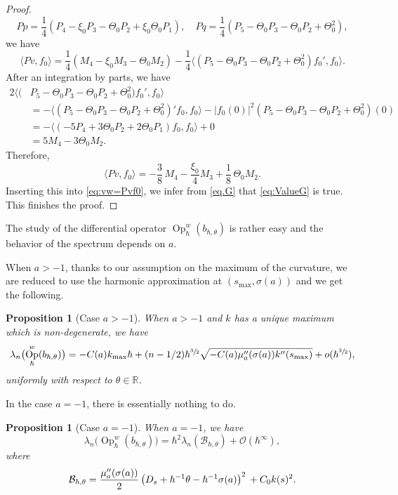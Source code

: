 \documentclass[JEP,XML,SOM,Unicode,NoFloatCountersInSection,published]{cedram}
\DeclareMathOperator{\Op}{Op}
\theoremstyle{plain}
\newtheorem{proposition}[theorem]{Proposition}
\theoremstyle{definition}
\begin{document}
\begin{proof}
\[
Pp=\frac14(P_4-\xi_0P_3-\Theta_0P_2+\xi_0\Theta_0P_1), \quad Pq=\frac14(P_5-\Theta_0P_3-\Theta_0P_2+\Theta_0^2),
\]
we have\vspace*{-3pt}
\[
\langle Pv,f_0\rangle=\frac14(M_4-\xi_0M_3-\Theta_0M_2)
-\frac14 \langle (P_5-\Theta_0P_3-\Theta_0P_2+\Theta_0^2)f_0',f_0\rangle.
\]
After an integration by parts, we have
\[
\begin{aligned}
2 \langle(&P_5-\Theta_0P_3-\Theta_0P_2+\Theta_0^2)f_0',f_0\rangle\\
&=- \bigl\langle (P_5-\Theta_0P_3-\Theta_0P_2+\Theta_0^2)'f_0,f_0\bigr\rangle -|f_0(0)|^2(P_5-\Theta_0P_3-\Theta_0P_2+\Theta_0^2)(0)\\
&=- \bigl\langle (-5P_4+3\Theta_0P_2+2\Theta_0P_1)f_0,f_0\bigr\rangle+0\\
&=5M_4-3\Theta_0M_2.
\end{aligned}
\]
Therefore,\vspace*{-3pt}
\[
\langle Pv,f_0\rangle=-\frac38\,M_4-\frac{\xi_0}4M_3+\frac18\,\Theta_0M_2.
\]
Inserting this into \eqref{eq:vw=Pvf0}, we infer from \eqref{eq.G} that \eqref{eq:ValueG} is true.
This finishes the proof.
\end{proof}

The study of the differential operator $\Op^w_\hbar (b_{\hbar,\theta})$ is rather easy and the behavior of the spectrum depends on $a$.

When $a>-1$, thanks to our assumption on the maximum of the curvature, we are reduced to use the harmonic approximation at $(s_{\max},\sigma(a))$ and we get the following.

\begin{proposition}[Case $a>-1$]\label{prop:finala>}
When $a>-1$ and $k$ has a unique maximum which is non-degenerate, we have
\[
\lambda_n\bigl(\Op^w_\hbar (b_{\hbar,\theta})\bigr)=-C(a)k_{\max}\hbar+(n-1/2)\hbar^{\sfrac32}\sqrt{-C(a)\mu''_a(\sigma(a))k''(s_{\max}) }+o(\hbar^{\sfrac32}),
\]
uniformly with respect to $\theta\in\mathbb{R}$.
\end{proposition}
In the case $a=-1$, there is essentially nothing to do.

\begin{proposition}[Case $a=-1$]\label{pro:final-1}
When $a=-1$, we have
\[
\lambda_n\bigl(\Op^w_\hbar (b_{\hbar,\theta})\bigr)=\hbar^2\lambda_n\left(\mathcal{B}_{\hbar,\theta}\right)+\mathscr{O}(\hbar^\infty),
\]
where
\begin{equation*}
\mathcal{B}_{\hbar,\theta}=\frac{\mu''_a(\sigma(a))}{2}\left(D_s+\hbar^{-1}\theta-\hbar^{-1}\sigma(a)\right)^2\\
+C_0 k(s)^2.
\end{equation*}
\end{proposition}
\end{document}
